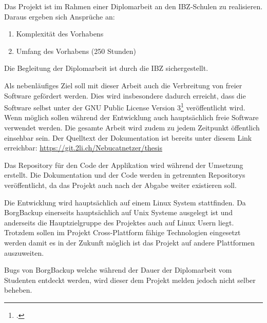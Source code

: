 Das Projekt ist im Rahmen einer Diplomarbeit an den IBZ-Schulen zu realisieren.
Daraus ergeben sich Ansprüche an:

\begin{enumerate}
\item Komplexität des Vorhabens
\item Umfang des Vorhabens (250 Stunden)
\end{enumerate}

Die Begleitung der Diplomarbeit ist durch die IBZ sichergestellt.

Als nebenläufiges Ziel soll mit dieser Arbeit auch die Verbreitung von freier
Software gefördert werden. Dies wird insbesondere dadurch erreicht, dass die
Software selbst unter der GNU Public License Version 3\footcite{gplv3}
veröffentlicht wird. Wenn möglich sollen während der Entwicklung auch
hauptsächlich freie Software verwendet werden. Die gesamte Arbeit wird zudem zu
jedem Zeitpunkt öffentlich einsehbar sein. Der Quelltext der Dokumentation ist
bereits unter diesem Link erreichbar: \url{https://git.2li.ch/Nebucatnetzer/thesis}

Das Repository für den Code der Applikation wird während der Umsetzung erstellt.
Die Dokumentation und der Code werden in getrennten Repositorys veröffentlicht,
da das Projekt auch nach der Abgabe weiter existieren soll.

Die Entwicklung wird hauptsächlich auf einem Linux System stattfinden. Da
BorgBackup einerseits hauptsächlich auf Unix Systeme ausgelegt ist und
anderseits die Hauptzielgruppe des Projektes auch auf Linux Usern liegt.
Trotzdem sollen im Projekt Cross-Plattform fähige Technologien eingesetzt werden
damit es in der Zukunft möglich ist das Projekt auf andere Plattformen
auszuweiten.

Bugs von BorgBackup welche während der Dauer der Diplomarbeit vom Studenten
entdeckt werden, wird dieser dem Projekt melden jedoch nicht selber beheben.

